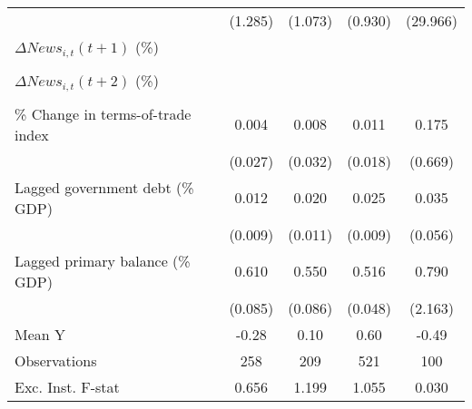 {\begin{tabular}{l*{4}{c}}
                    &     (1.285)         &     (1.073)         &     (0.930)         &    (29.966)         \\
\addlinespace
$ \Delta News_{i,t}(t+1)$ (\%)&                     &                     &                     &                     \\
                    &                     &                     &                     &                     \\
\addlinespace
$ \Delta News_{i,t}(t+2)$ (\%)&                     &                     &                     &                     \\
                    &                     &                     &                     &                     \\
\addlinespace
\% Change in terms-of-trade index&       0.004         &       0.008         &       0.011         &       0.175         \\
                    &     (0.027)         &     (0.032)         &     (0.018)         &     (0.669)         \\
\addlinespace
Lagged government debt (\% GDP)&       0.012         &       0.020\sym{*}  &       0.025\sym{***}&       0.035         \\
                    &     (0.009)         &     (0.011)         &     (0.009)         &     (0.056)         \\
\addlinespace
Lagged primary balance (\% GDP)&       0.610\sym{***}&       0.550\sym{***}&       0.516\sym{***}&       0.790         \\
                    &     (0.085)         &     (0.086)         &     (0.048)         &     (2.163)         \\
\midrule
Mean Y              &       -0.28         &        0.10         &        0.60         &       -0.49         \\
Observations        &         258         &         209         &         521         &         100         \\
Exc. Inst. F-stat   &       0.656         &       1.199         &       1.055         &       0.030         \\
\bottomrule
\end{tabular}
}
